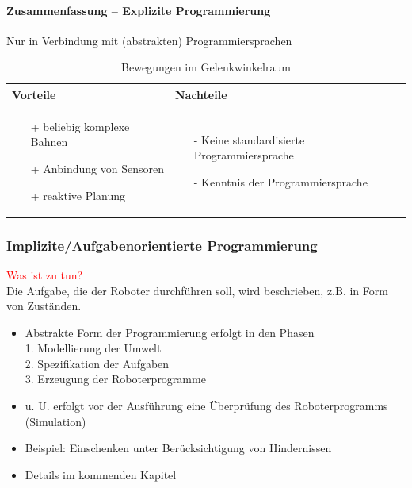 \paragraph{Zusammenfassung -- Explizite Programmierung} Nur in Verbindung mit (abstrakten) Programmiersprachen
\begin{table}[hbt]
\centering
\begin{tabular}{|p{7.5cm}|p{7.5cm}|}
\hline
Vorteile & Nachteile\\
\hline
\vspace{-5mm}
\begin{itemize}
\setlength\itemsep{0em}
\item[+] beliebig komplexe Bahnen
\item[+] Anbindung von Sensoren
\item[+] reaktive Planung
\end{itemize}
 &
 \vspace{-5mm}
\begin{itemize}
\setlength\itemsep{0em}
\item[-] Keine standardisierte Programmiersprache
\item[-] Kenntnis der Programmiersprache
\end{itemize}\\
\hline
\end{tabular}
\caption{Bewegungen im Gelenkwinkelraum}
\label{tab:bew}
\end{table}
\subsubsection{Implizite/Aufgabenorientierte Programmierung}
\textcolor{red}{\glqq Was ist zu tun?\grqq} \\
Die Aufgabe, die der Roboter durchführen soll, wird beschrieben, z.B. in Form von Zuständen.
\begin{itemize}
\item Abstrakte Form der Programmierung erfolgt in den Phasen\\
1. Modellierung der Umwelt\\
2. Spezifikation der Aufgaben\\
3. Erzeugung der Roboterprogramme
\item u. U. erfolgt vor der Ausführung eine Überprüfung des
Roboterprogramms (Simulation)
\item Beispiel: Einschenken unter Berücksichtigung von Hindernissen
\item Details im kommenden Kapitel
\end{itemize}